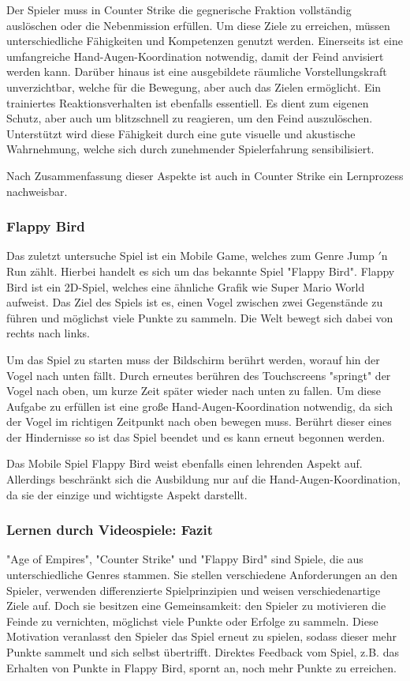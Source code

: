 Der Spieler muss in Counter Strike die gegnerische Fraktion vollständig auslöschen oder die Nebenmission erfüllen. Um diese Ziele zu erreichen, müssen unterschiedliche Fähigkeiten und Kompetenzen genutzt werden. Einerseits ist eine umfangreiche Hand-Augen-Koordination notwendig, damit der Feind anvisiert werden kann. Darüber hinaus ist eine ausgebildete räumliche Vorstellungskraft unverzichtbar, welche für die Bewegung, aber auch das Zielen ermöglicht. Ein trainiertes Reaktionsverhalten ist ebenfalls essentiell. Es dient zum eigenen Schutz, aber auch um blitzschnell zu reagieren, um den Feind auszulöschen. Unterstützt wird diese Fähigkeit durch eine gute visuelle und akustische Wahrnehmung, welche sich durch zunehmender Spielerfahrung sensibilisiert.

Nach Zusammenfassung dieser Aspekte ist auch in Counter Strike ein Lernprozess nachweisbar.

\subsubsection{Flappy Bird}
Das zuletzt untersuche Spiel ist ein Mobile Game, welches zum Genre Jump $'$n Run zählt. Hierbei handelt es sich um das bekannte Spiel "{}Flappy Bird"{}. Flappy Bird ist ein 2D-Spiel, welches eine ähnliche Grafik wie Super Mario World aufweist. Das Ziel des Spiels ist es, einen Vogel zwischen zwei Gegenstände zu führen und möglichst viele Punkte zu sammeln. Die Welt bewegt sich dabei von rechts nach links.

Um das Spiel zu starten muss der Bildschirm berührt werden, worauf hin der Vogel nach unten fällt. Durch erneutes berühren des Touchscreens "springt" der Vogel nach oben, um kurze Zeit später wieder nach unten zu fallen. Um diese Aufgabe zu erfüllen ist eine große Hand-Augen-Koordination notwendig, da sich der Vogel im richtigen Zeitpunkt nach oben bewegen muss. Berührt dieser eines der Hindernisse so ist das Spiel beendet und es kann erneut begonnen werden.

Das Mobile Spiel Flappy Bird weist ebenfalls einen lehrenden Aspekt auf. Allerdings beschränkt sich die Ausbildung nur auf die Hand-Augen-Koordination, da sie der einzige und wichtigste Aspekt darstellt.

\subsubsection{Lernen durch Videospiele: Fazit}
"{}Age of Empires"{}, "{}Counter Strike"{} und "{}Flappy Bird"{} sind Spiele, die aus unterschiedliche Genres stammen. Sie stellen verschiedene Anforderungen an den Spieler, verwenden differenzierte Spielprinzipien und weisen verschiedenartige Ziele auf. Doch sie besitzen eine Gemeinsamkeit: den Spieler zu motivieren die Feinde zu vernichten, möglichst viele Punkte oder Erfolge zu sammeln. Diese Motivation veranlasst den Spieler das Spiel erneut zu spielen, sodass dieser mehr Punkte sammelt und sich selbst übertrifft. Direktes Feedback vom Spiel, z.B. das Erhalten von Punkte in Flappy Bird, spornt an, noch mehr Punkte zu erreichen. 


